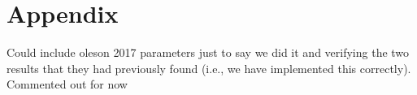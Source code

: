 \documentclass{article}
\begin{document}





\section*{Appendix}

Could include oleson 2017 parameters just to say we did it and verifying the two results that they had previously found (i.e., we have implemented this correctly). Commented out for now
\end{document}
